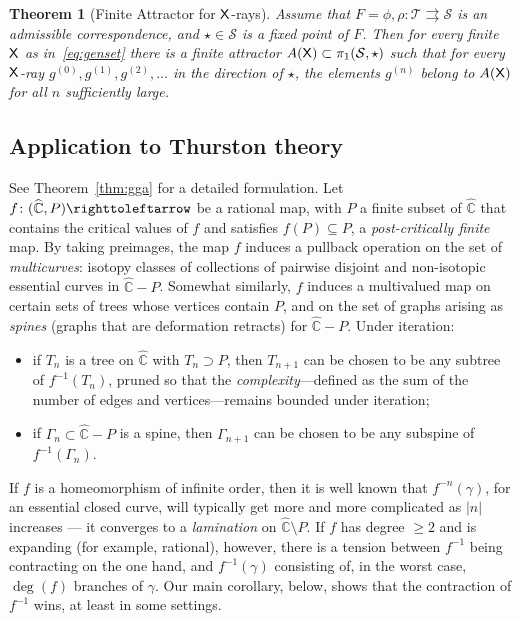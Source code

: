 \documentclass{amsart}
\newcommand\C{{\mathbb{C}}}
\newcommand{\rs}{\widehat{\C}}
\newtheorem{mainthm}{Theorem}\renewcommand\themainthm{\Alph{mainthm}}
\theoremstyle{definition}
\theoremstyle{remark}
\newcommand{\sfX}{{\sf X}}
\newcommand{\cT}{\mathcal{T}}
\newcommand{\cS}{\mathcal{S}}
\begin{document}
\begin{mainthm}[Finite Attractor for $\sfX$-rays]\label{thm:main X ray}
  Assume that $F=\phi, \rho\colon \cT \rightrightarrows\cS$ is an admissible correspondence, and $\star \in \cS$ is a fixed point of $F$.  Then for every finite $\sfX$ as in~\eqref{eq:genset} there is a finite attractor $A(\sfX) \subset \pi_1(\cS,\star)$ such that for every $\sfX$-ray $g^{(0)}, g^{(1)}, g^{(2)}, \ldots$ in the direction of $\star$, the elements $g^{(n)}$ belong to $A(\sfX)$ for all $n$ sufficiently large.
\end{mainthm}

\subsection{Application to Thurston theory}\label{ss:thurston} See Theorem~\ref{thm:gga} for a detailed formulation. Let $f\colon (\rs, P)\righttoleftarrow$ be a rational map, with $P$ a finite subset of $\rs$ that contains the critical values of $f$ and satisfies $f(P)\subseteq P$, a \emph{post-critically finite} map.  By taking preimages, the map $f$ induces a pullback operation on the set of \emph{multicurves}: isotopy classes of collections of pairwise disjoint and non-isotopic essential curves in $\rs-P$. Somewhat similarly, $f$ induces a multivalued map on certain sets of trees whose vertices contain $P$, and on the set of graphs arising as \emph{spines} (graphs that are deformation retracts) for $\rs-P$. Under iteration:
\begin{itemize}
\item if $T_n$ is a tree on $\rs$ with $T_n \supset P$, then $T_{n+1}$ can be chosen to be any subtree of $f^{-1}(T_n)$, pruned so that the \emph{complexity}---defined as the sum of the number of edges and vertices---remains bounded under iteration;
\item if $\Gamma_n\subset \rs-P$ is a spine, then $\Gamma_{n+1}$ can be chosen to be any subspine of $f^{-1}(\Gamma_n)$. 
\end{itemize}

If $f$ is a homeomorphism of infinite order, then it is well known that $f^{-n}(\gamma)$, for an essential closed curve, will typically get more and more complicated as $|n|$ increases --- it converges to a \emph{lamination} on $\rs\setminus P$. If $f$ has degree $\ge2$ and is expanding (for example, rational), however, there is a tension between $f^{-1}$ being contracting on the one hand, and $f^{-1}(\gamma)$ consisting of, in the worst case, $\deg(f)$ branches of $\gamma$. Our main corollary, below, shows that the contraction of $f^{-1}$ wins, at least in some settings.
\end{document}
